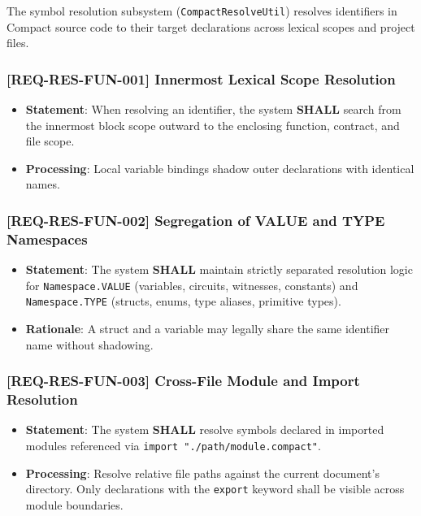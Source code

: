 The symbol resolution subsystem (\texttt{CompactResolveUtil}) resolves identifiers in Compact source code to their target declarations across lexical scopes and project files.

\subsubsection{[REQ-RES-FUN-001] Innermost Lexical Scope Resolution}
\begin{itemize}
    \item \textbf{Statement}: When resolving an identifier, the system \textbf{SHALL} search from the innermost block scope outward to the enclosing function, contract, and file scope.
    \item \textbf{Processing}: Local variable bindings shadow outer declarations with identical names.
\end{itemize}

\subsubsection{[REQ-RES-FUN-002] Segregation of VALUE and TYPE Namespaces}
\begin{itemize}
    \item \textbf{Statement}: The system \textbf{SHALL} maintain strictly separated resolution logic for \texttt{Namespace.VALUE} (variables, circuits, witnesses, constants) and \texttt{Namespace.TYPE} (structs, enums, type aliases, primitive types).
    \item \textbf{Rationale}: A struct and a variable may legally share the same identifier name without shadowing.
\end{itemize}

\subsubsection{[REQ-RES-FUN-003] Cross-File Module and Import Resolution}
\begin{itemize}
    \item \textbf{Statement}: The system \textbf{SHALL} resolve symbols declared in imported modules referenced via \texttt{import "./path/module.compact"}.
    \item \textbf{Processing}: Resolve relative file paths against the current document's directory. Only declarations with the \texttt{export} keyword shall be visible across module boundaries.
\end{itemize}

